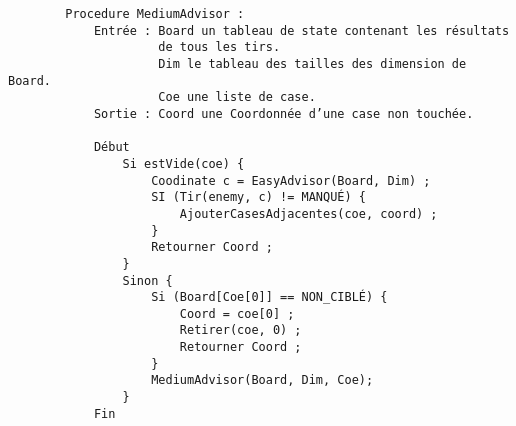     \begin{verbatim}
        Procedure MediumAdvisor :
            Entrée : Board un tableau de state contenant les résultats
            		 de tous les tirs.
                     Dim le tableau des tailles des dimension de Board.
                     Coe une liste de case.
            Sortie : Coord une Coordonnée d’une case non touchée.
            
            Début
                Si estVide(coe) {
                    Coodinate c = EasyAdvisor(Board, Dim) ;
                    SI (Tir(enemy, c) != MANQUÉ) {
                        AjouterCasesAdjacentes(coe, coord) ;
                    }
                    Retourner Coord ;
                }
                Sinon {
                    Si (Board[Coe[0]] == NON_CIBLÉ) {
                        Coord = coe[0] ;
                        Retirer(coe, 0) ;
                        Retourner Coord ;
                    }
                    MediumAdvisor(Board, Dim, Coe);
                }
            Fin
    \end{verbatim}

